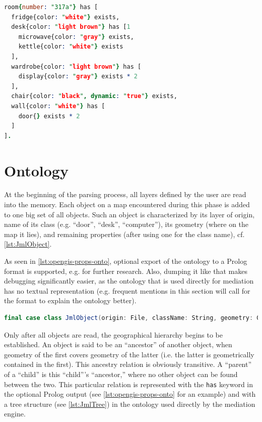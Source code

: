 \begin{lstlisting}[language=Prolog,caption={Ontology exported to Prolog source code for room ``317a'' containing the ``chair'' from \cref{fig:opengis-props-map} at line 10.},label=lst:opengis-props-onto]
room{number: "317a"} has [
  fridge{color: "white"} exists,
  desk{color: "light brown"} has [1
    microwave{color: "gray"} exists,
    kettle{color: "white"} exists
  ],
  wardrobe{color: "light brown"} has [
    display{color: "gray"} exists * 2
  ],
  chair{color: "black", dynamic: "true"} exists,
  wall{color: "white"} has [
    door{} exists * 2
  ]
].
\end{lstlisting}

\section{Ontology}
\label{sec:ontology}

At the beginning of the parsing process, all layers defined by the user are read into the memory. Each object on a map encountered during this phase is added to one big set of all objects. Such an object is characterized by its layer of origin, name of its class (e.g. ``door'', ``desk'', ``computer''), its geometry (where on the map it lies), and remaining properties (after using one for the class name), cf. \cref{lst:JmlObject}.

As seen in \cref{lst:opengis-props-onto}, optional export of the ontology to a Prolog format is supported, e.g. for further research. Also, dumping it like that makes debugging significantly easier, as the ontology that is used directly for mediation has no textual representation (e.g. frequent mentions in this section will call for the format to explain the ontology better).

\begin{lstlisting}[language=scala,caption={Definition of an object read from an OpenGIS map.},label=lst:JmlObject]
final case class JmlObject(origin: File, className: String, geometry: Geometry, props: Map[String, String])
\end{lstlisting}

Only after all objects are read, the geographical hierarchy begins to be established. An object is said to be an ``ancestor'' of another object, when geometry of the first covers geometry of the latter (i.e. the latter is geometrically contained in the first). This ancestry relation is obviously transitive. A ``parent'' of a ``child'' is this ``child'''s ``ancestor,'' where no other object can be found between the two. This particular relation is represented with the \texttt{has} keyword in the optional Prolog output (see \cref{lst:opengis-props-onto} for an example) and with a tree structure (see \cref{lst:JmlTree}) in the ontology used directly by the mediation engine.

